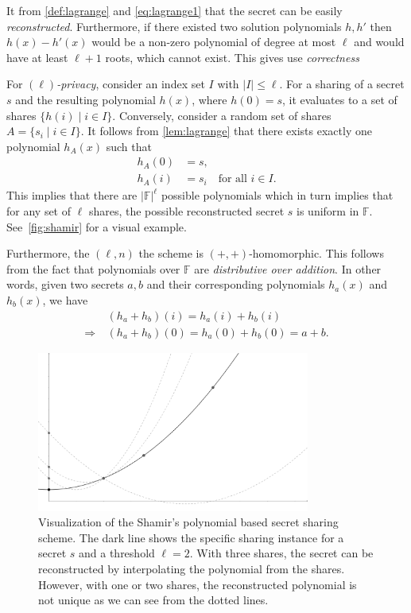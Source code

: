 \documentclass[11pt]{report}
\theoremstyle{definition}
\theoremstyle{plain}
\begin{document}
It from \autoref{def:lagrange} and \autoref{eq:lagrange1} that the secret can be easily \textit{reconstructed}. Furthermore, if there existed two solution polynomials $h, h'$ then $h(x) - h'(x)$ would be a non-zero polynomial of degree at most $\ell$ and would have at least $\ell + 1$ roots, which cannot exist. This gives use \textit{correctness}

For \textit{$(\ell)$-privacy}, consider an index set $I$ with $|I| \leq \ell$. For a sharing of a secret $s$ and the resulting polynomial $h(x)$, where $h(0) = s$, it evaluates to a set of shares $\{h(i) \mid i \in I\}$.
Conversely, consider a random set of shares $A = \{s_i \mid i \in I\}$. It follows from \autoref{lem:lagrange} that there exists exactly one polynomial $h_A(x)$ such that
\begin{align*}
  h_A(0) & = s,                                 \\
  h_A(i) & = s_i \quad \text{for all } i \in I.
\end{align*}
This implies that there are $|\mathbb{F}|^\ell$ possible polynomials which in turn implies that for any set of $\ell$ shares, the possible reconstructed secret $s$ is uniform in $\mathbb{F}$. See~\autoref{fig:shamir} for a visual example.

Furthermore, the $(\ell, n)$ the scheme is $(+, +)$-homomorphic. This follows from the fact that polynomials over $\mathbb{F}$ are \textit{distributive over addition}. In other words, given two secrets $a, b$ and their corresponding polynomials $h_a(x)$ and $h_b(x)$, we have
\begin{align*}
                & (h_a + h_b)(i) = h_a(i) + h_b(i)          \\
  \Rightarrow\  & (h_a + h_b)(0) = h_a(0) + h_b(0) = a + b.
\end{align*}

\begin{figure}
  \centering
  \includegraphics[width=0.8\textwidth]{images/shamir.png}
  \caption{Visualization of the Shamir's polynomial based secret sharing scheme. The dark line shows the specific sharing instance for a secret $s$ and a threshold $\ell=2$. With three shares, the secret can be reconstructed by interpolating the polynomial from the shares. However, with one or two shares, the reconstructed polynomial is not unique as we can see from the dotted lines.}\label{fig:shamir}
\end{figure}
\end{document}
